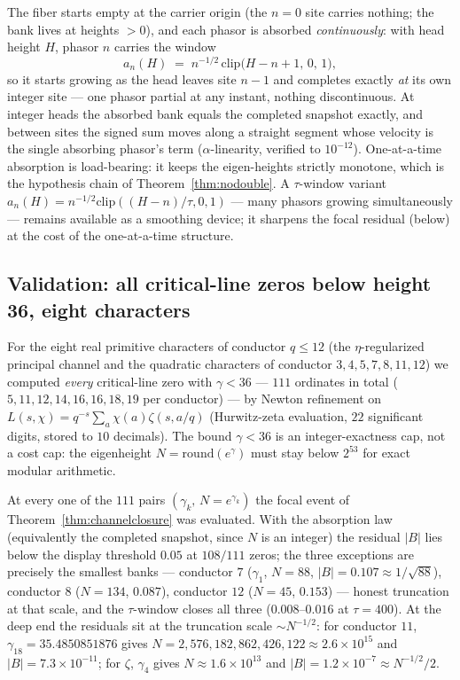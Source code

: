 \documentclass[11pt]{article}
\begin{document}
The fiber starts empty at the carrier origin (the $n=0$ site carries nothing; the bank lives at
heights $>0$), and each phasor is absorbed \emph{continuously}: with head height $H$, phasor $n$
carries the window
\[
  a_n(H) \;=\; n^{-1/2}\,\mathrm{clip}\bigl(H-n+1,\,0,\,1\bigr),
\]
so it starts growing as the head leaves site $n-1$ and completes exactly \emph{at} its own integer
site --- one phasor partial at any instant, nothing discontinuous.  At integer heads the absorbed
bank equals the completed snapshot exactly, and between sites the signed sum moves along a straight
segment whose velocity is the single absorbing phasor's term ($\alpha$-linearity, verified to
$10^{-12}$).  One-at-a-time absorption is load-bearing: it keeps the eigen-heights strictly
monotone, which is the hypothesis chain of Theorem~\ref{thm:nodouble}.  A $\tau$-window variant
$a_n(H)=n^{-1/2}\mathrm{clip}((H-n)/\tau,0,1)$ --- many phasors growing simultaneously --- remains
available as a smoothing device; it sharpens the focal residual (below) at the cost of the
one-at-a-time structure.

\subsection{Validation: all critical-line zeros below height 36, eight characters}\label{sub:validation}

For the eight real primitive characters of conductor $q\le12$ (the $\eta$-regularized principal
channel and the quadratic characters of conductor $3,4,5,7,8,11,12$) we computed \emph{every}
critical-line zero with $\gamma<36$ --- $111$ ordinates in total
($5,11,12,14,16,16,18,19$ per conductor) --- by Newton refinement on
$L(s,\chi)=q^{-s}\sum_a\chi(a)\zeta(s,a/q)$ (Hurwitz-zeta evaluation, $22$ significant digits,
stored to $10$ decimals).  The bound $\gamma<36$ is an integer-exactness cap, not a cost cap: the
eigenheight $N=\mathrm{round}(e^{\gamma})$ must stay below $2^{53}$ for exact modular arithmetic.

At every one of the $111$ pairs $(\gamma_k,\,N=e^{\gamma_k})$ the focal event of
Theorem~\ref{thm:channelclosure} was evaluated.  With the absorption law (equivalently the completed
snapshot, since $N$ is an integer) the residual $|B|$ lies below the display threshold $0.05$ at
$108/111$ zeros; the three exceptions are precisely the smallest banks --- conductor $7$
($\gamma_1$, $N=88$, $|B|=0.107\approx1/\sqrt{88}$), conductor $8$ ($N=134$, $0.087$), conductor
$12$ ($N=45$, $0.153$) --- honest truncation at that scale, and the $\tau$-window closes all three
($0.008$--$0.016$ at $\tau=400$).  At the deep end the residuals sit at the truncation scale
$\sim N^{-1/2}$: for conductor $11$, $\gamma_{18}=35.4850851876$ gives
$N=2{,}576{,}182{,}862{,}426{,}122\approx2.6\times10^{15}$ and $|B|=7.3\times10^{-11}$; for $\zeta$,
$\gamma_4$ gives $N\approx1.6\times10^{13}$ and $|B|=1.2\times10^{-7}\approx N^{-1/2}/2$.
\end{document}
